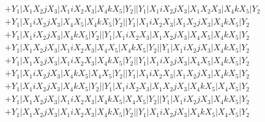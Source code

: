 \documentclass{article}[12pt]
\begin{document}
\begin{align*}
 & +Y_1|X_1X_2jX_3|X_1iX_2X_3|X_4kX_5|Y_2||Y_1|X_1iX_2jX_3|X_1X_2X_3|X_4kX_5|Y_2\\ 
 & +Y_1|X_1iX_2jX_3|X_4X_5|X_4kX_5|Y_2||Y_1|X_1iX_2X_3|X_1X_2jX_3|X_4kX_5|Y_2\\ 
 & +Y_1|X_1iX_2jX_3|X_4kX_5|Y_2||Y_1|X_1iX_2X_3|X_1X_2jX_3|X_4X_5|X_4kX_5|Y_2\\ 
 & +Y_1|X_1X_2jX_3|X_1iX_2X_3|X_4X_5|X_4kX_5|Y_2||Y_1|X_1iX_2jX_3|X_4kX_5|Y_2\\ 
 & +Y_1|X_1X_2jX_3|X_1iX_2X_3|X_4kX_5|Y_2||Y_1|X_1iX_2jX_3|X_4X_5|X_4kX_5|Y_2\\ 
 & +Y_1|X_1iX_2jX_3|X_4kX_5|X_4X_5|Y_2||Y_1|X_1iX_2X_3|X_1X_2jX_3|X_4kX_5|Y_2\\ 
 & +Y_1|X_1iX_2jX_3|X_4kX_5|Y_2||Y_1|X_1iX_2X_3|X_1X_2jX_3|X_4kX_5|X_4X_5|Y_2\\ 
 & +Y_1|X_1X_2jX_3|X_1iX_2X_3|X_4kX_5|X_4X_5|Y_2||Y_1|X_1iX_2jX_3|X_4kX_5|Y_2\\ 
 & +Y_1|X_1X_2jX_3|X_1iX_2X_3|X_4kX_5|Y_2||Y_1|X_1iX_2jX_3|X_4kX_5|X_4X_5|Y_2\end{align*}
 
 
\end{document}
